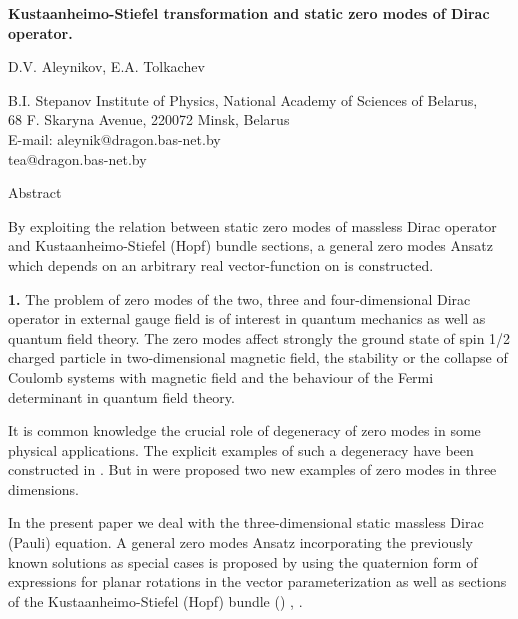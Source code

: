 \documentclass[12pt,a4paper]{article}
\begin{document}
\begin{center}
{\large \bf Kustaanheimo-Stiefel transformation and static zero modes of
Dirac operator.}
\end{center}
\begin{center}
\large D.V. Aleynikov, E.A. Tolkachev
\end{center}
\begin{center}
{B.I. Stepanov Institute of Physics, National Academy of
Sciences of Belarus, \\ 68 F. Skaryna Avenue, 220072 Minsk,
Belarus\\ {\small \rm
   E-mail:     aleynik@dragon.bas-net.by \\ \hspace{1cm} tea@dragon.bas-net.by}}
\end{center}
\begin{center}
Abstract
\end{center}

{\small{By exploiting the relation between static zero modes of massless Dirac operator and
Kustaanheimo-Stiefel (Hopf) bundle sections, a general zero modes Ansatz which
depends on an arbitrary real vector-function on \coordHE{} is constructed.}}

\vspace{1cm}
{\bf 1.} The problem of zero modes of the two, three and four-dimensional Dirac operator
in external gauge field is of interest in quantum mechanics as well as quantum
field theory. The zero modes affect strongly the ground state of spin 1/2 charged
particle in two-dimensional magnetic field, the stability or the collapse of
Coulomb systems with magnetic field and the behaviour of the Fermi determinant
in quantum field theory.

It is common knowledge \cite{Fry} the crucial role of degeneracy of zero modes in some physical
applications. The explicit examples of such a degeneracy have been constructed
in \cite{Nash}. But in \cite{Elton} were proposed two new examples of zero
modes in three dimensions.

In the present paper we deal with the three-dimensional static massless Dirac (Pauli) equation.
A general zero modes Ansatz  incorporating the previously known
solutions as special cases is proposed by using the quaternion form of expressions for  planar
\coordHE{} rotations in the vector parameterization  \cite{Fedorov} as well as sections of
the Kustaanheimo-Stiefel (Hopf) bundle \coordHE{} (\coordHE{})
\cite{Pris1}, \cite{Pris2}.
\end{document}
